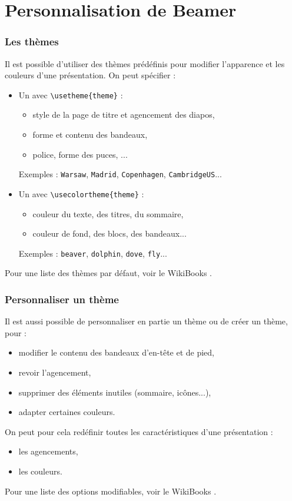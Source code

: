 \section{Personnalisation de Beamer}

\begin{frame}[fragile]
  \frametitle{Les thèmes}

Il est possible d'utiliser des thèmes prédéfinis pour modifier l'apparence et les couleurs d'une présentation. On peut spécifier :
\begin{itemize}
  \item Un  avec \lstinline?\usetheme{theme}? :
  \begin{itemize}
    \item style de la page de titre et agencement des diapos,
    \item forme et contenu des bandeaux,
    \item police, forme des puces, ...
  \end{itemize}
  Exemples : \lstinline?Warsaw?, \lstinline?Madrid?, \lstinline?Copenhagen?, \lstinline?CambridgeUS?...
  \item Un  avec \lstinline?\usecolortheme{theme}? :
  \begin{itemize}
    \item couleur du texte, des titres, du sommaire,
    \item couleur de fond, des blocs, des bandeaux...
  \end{itemize}
  Exemples : \lstinline?beaver?, \lstinline?dolphin?, \lstinline?dove?, \lstinline?fly?...
\end{itemize}

\bigskip
Pour une liste des thèmes par défaut, voir le WikiBooks \cite{wikibooksbeamer}.
\end{frame}



\begin{frame}[fragile]
  \frametitle{Personnaliser un thème}

Il est aussi possible de personnaliser en partie un thème ou de créer un thème, pour :
\begin{itemize}
  \item modifier le contenu des bandeaux d'en-tête et de pied,
  \item revoir l'agencement,
  \item supprimer des éléments inutiles (sommaire, icônes...),
  \item adapter certaines couleurs.
\end{itemize}

\bigskip
On peut pour cela redéfinir toutes les caractéristiques d'une présentation :
\begin{itemize}
  \item les agencements,
  \item les couleurs.
\end{itemize}

\bigskip
Pour une liste des options modifiables, voir le WikiBooks \cite{wikibooksbeamer}.
\end{frame}



